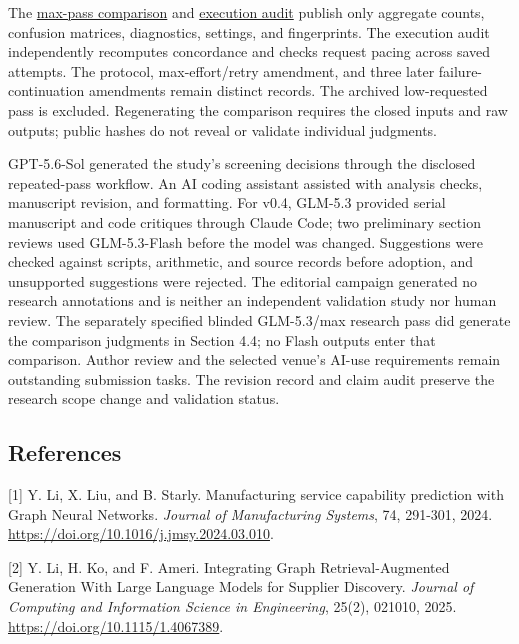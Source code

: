 \documentclass[10pt]{article}
\begin{document}
The \href{https://github.com/elijahqi/us-sme-signal-graph/blob/main/paper/glm_max_cross_review_v0_4.json}{max-pass comparison} and \href{https://github.com/elijahqi/us-sme-signal-graph/blob/main/paper/glm_max_execution_audit_v0_4.json}{execution audit} publish only aggregate counts, confusion matrices, diagnostics, settings, and fingerprints. The execution audit independently recomputes concordance and checks request pacing across saved attempts. The protocol, max-effort/retry amendment, and three later failure-continuation amendments remain distinct records. The archived low-requested pass is excluded. Regenerating the comparison requires the closed inputs and raw outputs; public hashes do not reveal or validate individual judgments.

GPT-5.6-Sol generated the study's screening decisions through the disclosed repeated-pass workflow. An AI coding assistant assisted with analysis checks, manuscript revision, and formatting. For v0.4, GLM-5.3 provided serial manuscript and code critiques through Claude Code; two preliminary section reviews used GLM-5.3-Flash before the model was changed. Suggestions were checked against scripts, arithmetic, and source records before adoption, and unsupported suggestions were rejected. The editorial campaign generated no research annotations and is neither an independent validation study nor human review. The separately specified blinded GLM-5.3/max research pass did generate the comparison judgments in Section 4.4; no Flash outputs enter that comparison. Author review and the selected venue's AI-use requirements remain outstanding submission tasks. The revision record and claim audit preserve the research scope change and validation status.

\begingroup
\small

\hypertarget{references}{%
\subsection{References}\label{references}}

{[}1{]} Y. Li, X. Liu, and B. Starly. Manufacturing service capability prediction with Graph Neural Networks. \emph{Journal of Manufacturing Systems}, 74, 291-301, 2024. \url{https://doi.org/10.1016/j.jmsy.2024.03.010}.

{[}2{]} Y. Li, H. Ko, and F. Ameri. Integrating Graph Retrieval-Augmented Generation With Large Language Models for Supplier Discovery. \emph{Journal of Computing and Information Science in Engineering}, 25(2), 021010, 2025. \url{https://doi.org/10.1115/1.4067389}.
\end{document}

